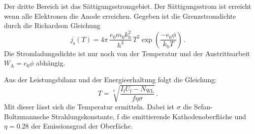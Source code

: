 Der dritte Bereich ist das Sättigungsstromgebiet. Der Sättigungsstrom ist erreicht wenn alle Elektronen die Anode erreichen. Gegeben ist die Grenzstromdichte durch die Richardson Gleichung
\begin{equation}
    j_{\text{s}}(T)=4 \pi\, \frac{e_0 m_0 k_\text{b}^2}{h^3}\, T^2 \exp \left(\frac{-e_0 \phi}{k_\text{b} T}\right) \, .
    \label{eqn:richard}
\end{equation}
Die Stromladungsdichte ist nur noch von der Temperatur und der Austrittsarbeit $W_\text{A}=e_0 \phi$ abhängig.

Aus der Leistungsbilanz und der Energieerhaltung folgt die Gleichung:
\begin{equation}
    T=\sqrt[4]{\frac{I_\text{f} U_\text{f}- N_\text{WL}}{f \eta \sigma}} \, .
    \label{eqn:ein viertel}
\end{equation}
Mit dieser lässt sich die Temperatur ermitteln.
Dabei ist $\sigma$ die Sefan-Boltzmannsche Strahlungskonstante, f die emittierende Kathodenoberfläche und $\eta=0.28$ der Emissionsgrad der Oberfäche.